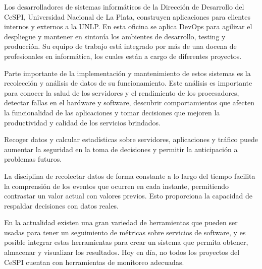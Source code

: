 Los desarrolladores de sistemas informáticos de la Dirección de Desarrollo del
CeSPI, Universidad Nacional de La Plata, construyen aplicaciones para clientes
internos y externos a la UNLP. En esta oficina se aplica DevOps para agilizar
el despliegue y mantener en sintonía los ambientes de desarrollo, testing y
producción. Su equipo de trabajo está integrado por más de una docena de
profesionales en informática, los cuales están a cargo de diferentes proyectos.

Parte importante de la implementación y mantenimiento de estos sistemas es la
recolección y análisis de datos de su funcionamiento. Este análisis es
importante para conocer la salud de los servidores y el rendimiento de los
procesadores, detectar fallas en el hardware y software, descubrir
comportamientos que afecten la funcionalidad de las aplicaciones y tomar
decisiones que mejoren la productividad y calidad de los servicios brindados.

Recoger datos y calcular estadísticas sobre servidores, aplicaciones y tráfico
puede aumentar la seguridad en la toma de decisiones y permitir la anticipación
a problemas futuros.

La disciplina de recolectar datos de forma constante a lo largo del tiempo
facilita la comprensión de los eventos que ocurren en cada instante,
permitiendo contrastar un valor actual con valores previos. Esto proporciona la
capacidad de respaldar decisiones con datos reales.

En la actualidad existen una gran variedad de herramientas que pueden ser
usadas para tener un seguimiento de métricas sobre servicios de software, y es
posible integrar estas herramientas para crear un sistema que permita obtener,
almacenar y visualizar los resultados. Hoy en día, no todos los proyectos del
CeSPI cuentan con herramientas de monitoreo adecuadas.

